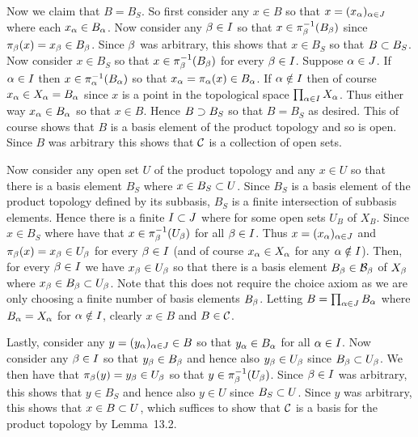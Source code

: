 {{    Now we claim that $B = B_S$.
    So first consider any $x \in B$ so that $x = (x_\a)_{\a \in J}$ where each $x_\a \in B_\a$.
    Now consider any $\b \in I$ so that $x \in \inv{\pi_\b}(B_\b)$ since $\pi_\b(x) = x_\b \in B_\b$.
    Since $\b$ was arbitrary, this shows that $x \in B_S$ so that $B \ss B_S$.
    Now consider $x \in B_S$ so that $x \in \inv{\pi_\b}(B_\b)$ for every $\b \in I$.
    Suppose $\a \in J$.
    If $\a \in I$ then $x \in \inv{\pi_\a}(B_\a)$ so that $x_\a = \pi_\a(x) \in B_\a$.
    If $\a \notin I$ then of course $x_\a \in X_\a = B_\a$ since $x$ is a point in the topological space $\prod_{\a \in I} X_\a$.
    Thus either way $x_\a \in B_\a$ so that $x \in B$.
    Hence $B \sps B_S$ so that $B = B_S$ as desired.
    This of course shows that $B$ is a basis element of the product topology and so is open.
    Since $B$ was arbitrary this shows that $\cC$ is a collection of open sets.

    Now consider any open set $U$ of the product topology and any $x \in U$ so that there is a basis element $B_S$ where $x \in B_S \ss U$.
    Since $B_S$ is a basis element of the product topology defined by its subbasis, $B_S$ is a finite intersection of subbasis elements.
    Hence there is a finite $I \ss J$ where
    for some open sets $U_B$ of $X_B$.
    Since $x \in B_S$ where have that $x \in \inv{\pi_\b}(U_\b)$ for all $\b \in I$.
    Thus $x = (x_\a)_{\a \in J}$ and $\pi_\b(x) = x_\b \in U_\b$ for every $\b \in I$ (and of course $x_\a \in X_\a$ for any $\a \notin I$).
    Then, for every $\b \in I$ we have $x_\b \in U_\b$ so that there is a basis element $B_\b \in \cB_\b$ of $X_\b$ where $x_\b \in B_\b \ss U_\b$.
    Note that this does not require the choice axiom as we are only choosing a finite number of basis elements $B_\b$.
    Letting $B = \prod_{\a \in J} B_\a$ where $B_\a = X_\a$ for $\a \notin I$, clearly $x \in B$ and $B \in \cC$.

    Lastly, consider any $y = (y_\a)_{\a \in J} \in B$ so that $y_\a \in B_\a$ for all $\a \in I$.
    Now consider any $\b \in I$ so that $y_\b \in B_\b$ and hence also $y_\b \in U_\b$ since $B_\b \ss U_\b$.
    We then have that $\pi_\b(y) = y_\b \in U_\b$ so that $y \in \inv{\pi_\b}(U_\b)$.
    Since $\b \in I$ was arbitrary, this shows that $y \in B_S$ and hence also $y \in U$ since $B_S \ss U$.
    Since $y$ was arbitrary, this shows that $x \in B \ss U$, which suffices to show that $\cC$ is a basis for the product topology by Lemma~13.2.
  }
}


